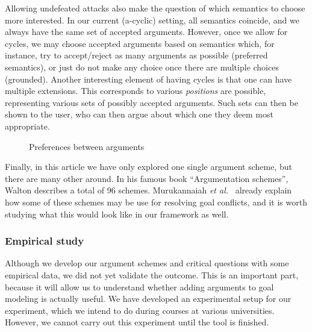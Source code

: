 Allowing undefeated attacks also make the question of which semantics to choose more interested. In our current (a-cyclic) setting, all semantics coincide, and we always have the same set of accepted arguments. However, once we allow for cycles, we may choose accepted arguments based on semantics which, for instance, try to accept/reject as many arguments as possible (preferred semantics), or just do not make any choice once there are multiple choices (grounded). Another interesting element of having cycles is that one can have multiple extensions. This corresponds to various \emph{positions} are possible, representing various sets of possibly accepted arguments. Such sets can then be shown to the user, who can then argue about which one they deem most appropriate.


\begin{figure}[ht]
\centering
{}
\caption{Preferences between arguments}
\label{fig:goalmodeling:futureargs}
\end{figure}  

Finally, in this article we have only explored one single argument scheme, but there are many other around. In his famous book ``Argumentation schemes'', Walton describes a total of 96 schemes. Murukannaiah \emph{et al.}~\cite{murukannaiah2015} already explain how some of these schemes may be use for resolving goal conflicts, and it is worth studying what this would look like in our framework as well.

\subsubsection*{Empirical study}

Although we develop our argument schemes and critical questions with some empirical data, we did not yet validate the outcome. This is an important part, because it will allow us to understand whether adding arguments to goal modeling is actually useful. We have developed an experimental setup for our experiment, which we intend to do during courses at various universities. However, we cannot carry out this experiment until the tool is finished.

